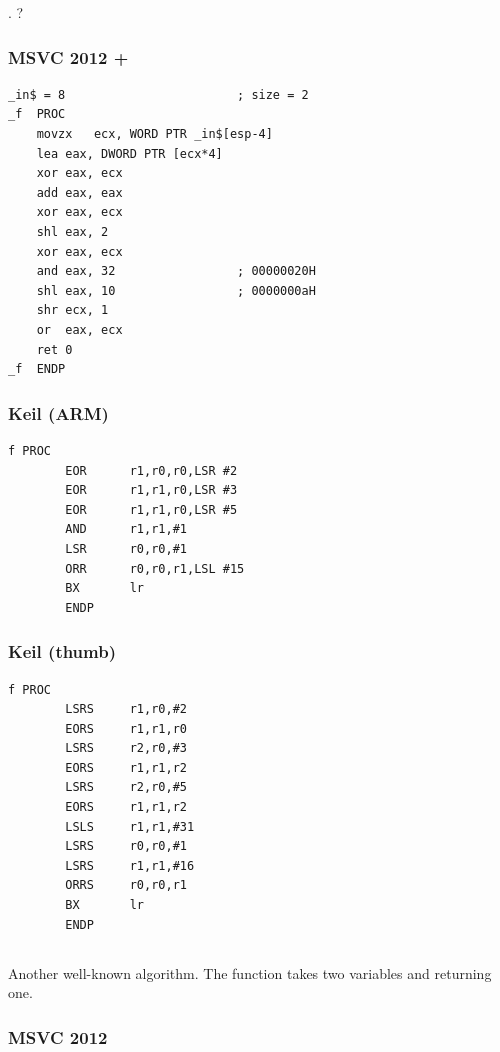 .
?

\subsubsection{MSVC 2012 + }

\begin{lstlisting}
_in$ = 8						; size = 2
_f	PROC
	movzx	ecx, WORD PTR _in$[esp-4]
	lea	eax, DWORD PTR [ecx*4]
	xor	eax, ecx
	add	eax, eax
	xor	eax, ecx
	shl	eax, 2
	xor	eax, ecx
	and	eax, 32					; 00000020H
	shl	eax, 10					; 0000000aH
	shr	ecx, 1
	or	eax, ecx
	ret	0
_f	ENDP
\end{lstlisting}

\subsubsection{Keil (ARM)}

\begin{lstlisting}
f PROC
        EOR      r1,r0,r0,LSR #2
        EOR      r1,r1,r0,LSR #3
        EOR      r1,r1,r0,LSR #5
        AND      r1,r1,#1
        LSR      r0,r0,#1
        ORR      r0,r0,r1,LSL #15
        BX       lr
        ENDP
\end{lstlisting}

\subsubsection{Keil (thumb)}

\begin{lstlisting}
f PROC
        LSRS     r1,r0,#2
        EORS     r1,r1,r0
        LSRS     r2,r0,#3
        EORS     r1,r1,r2
        LSRS     r2,r0,#5
        EORS     r1,r1,r2
        LSLS     r1,r1,#31
        LSRS     r0,r0,#1
        LSRS     r1,r1,#16
        ORRS     r0,r0,r1
        BX       lr
        ENDP
\end{lstlisting}

\subsection{}

{Another well-known algorithm. The function takes two variables and returning one.}

\subsubsection{MSVC 2012}

